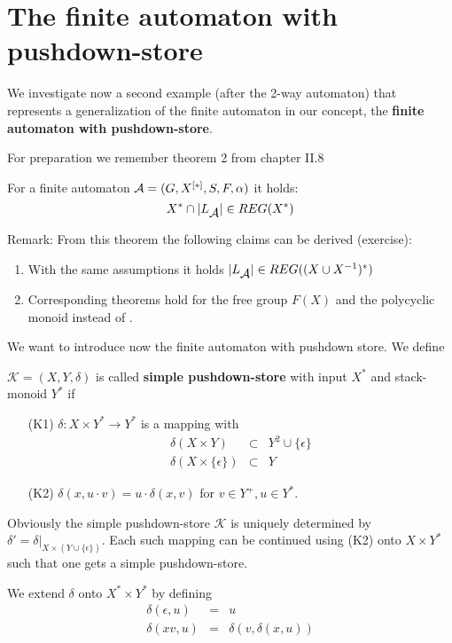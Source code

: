 \section{The finite automaton with pushdown-store}

We investigate now a second example (after the 2-way automaton) that represents
a generalization of the finite automaton in our concept, the {\bf finite
automaton with pushdown-store}.

For preparation we remember theorem 2 from chapter II.8

\begin{theorem}
For a finite automaton $\mbox{$\mathcal{A}$} = (G, \mbox{${X}^{[*]}$}, S, F, \alpha)$ it holds:
\[ X^* \cap |L_{\mbox{$\mathcal{A}$}}| \in REG(X^*) \]
\end{theorem}

Remark: From this theorem the following claims can be derived (exercise):
\begin{enumerate}
  \item With the same assumptions it holds $|L_{\mbox{$\mathcal{A}$}}| \in REG((X\cup
  X^{-1})^*)$
  \item Corresponding theorems hold for the free group $F(X)$ and the polycyclic
  monoid  instead of .
\end{enumerate}
  
We want to introduce now the finite automaton with pushdown store. We define
\begin{definition}
$\mathcal{K} = (X, Y, \delta)$ is called {\bf simple pushdown-store} with
input $X^*$ and stack-monoid $Y^*$ if
\begin{itemize}
  \item[(K1)] $\delta: X \times Y^* \to Y^*$ is a mapping with
  \begin{eqnarray*}
  \delta(X \times Y) & \subset & Y^2 \cup \{\epsilon\} \\
  \delta(X \times \{\epsilon\}) & \subset & Y
  \end{eqnarray*} 
  \item[(K2)] $\delta(x, u \cdot v) = u \cdot \delta(x, v)$ for $v \in Y^+,u \in
  Y^*$.
\end{itemize}
\end{definition} 

Obviously the simple pushdown-store $\mathcal{K}$ is uniquely determined by
$\delta' = \delta |_{X \times (Y \cup \{\epsilon\})}$. Each such mapping can be
continued using (K2) onto $X \times Y^*$ such that one gets a simple
pushdown-store.

We extend $\delta$ onto $X^* \times Y^*$ by defining
\begin{eqnarray*}
\delta(\epsilon, u) & = & u \\
\delta(x v, u) & = & \delta(v,  \delta(x,u))
\end{eqnarray*}

